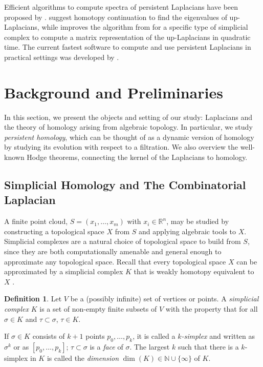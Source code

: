 \documentclass[11pt]{article}
\theoremstyle{definition}
\newtheorem{definition}[theorem]{Definition}
\theoremstyle{remark}
\begin{document}
Efficient algorithms to compute spectra of persistent Laplacians have been proposed by \citet{mww}.
\citet{htp_cont} suggest homotopy continuation to find the eigenvalues of up-Laplacians, while \citet{fastalg} improves the algorithm from \citet{mww} for a specific type of simplicial complex to compute a matrix representation of the up-Laplacians in quadratic time. The current fastest software to compute and use persistent Laplacians in practical settings was developed by \citet{petls}. 



\section{Background and Preliminaries} 
\label{sec:motivation}

In this section, we present the objects and setting of our study: Laplacians and the theory of homology arising from algebraic topology.  In particular, we study \emph{persistent homology}, which can be thought of as a dynamic version of homology by studying its evolution with respect to a filtration. We also overview the well-known Hodge theorems, connecting the kernel of the Laplacians to homology.  

\subsection{Simplicial Homology and The Combinatorial Laplacian} 
\label{sec:tda}

A finite point cloud, $S = (x_1, \dots, x_m)$ with $x_i \in \mathbb{R}^n$, may be studied by constructing a topological space $X$ from $S$ and applying algebraic tools to $X$. Simplicial complexes are a natural choice of topological space to build from $S$, since they are both computationally amenable and general enough to approximate any topological space.  Recall that every topological space $X$ can be approximated by a simplicial complex $K$ that is weakly homotopy equivalent to $X$ \citep[Proposition 4.13, Theorem 2C.5]{hatcher}. 

\begin{definition}\textnormal{\citep[Combinatorial Simplicial Complex,][p.~107]{hatcher}}
\label{def:comb_simp_cplx}
    Let $V$ be a (possibly infinite) set of vertices or points. A \emph{simplicial complex} $K$ is a set of non-empty finite subsets of $V$ with the property that for all $\sigma \in K$ and $\tau \subset \sigma$, $\tau \in K$.
    
    If $\sigma \in K$ consists of $k+1$ points $p_0,\dots,p_k$, it is called a $k$\emph{-simplex} and written as $\sigma^k$ or as $[p_0,\dots,p_k]$; $\tau \subset \sigma$ is a \emph{face} of $\sigma$. The largest $k$ such that there is a $k$-simplex in $K$ is called the \emph{dimension} $\dim(K) \in \mathbb{N} \cup \{\infty\}$ of $K$.
\end{definition}
\end{document}
